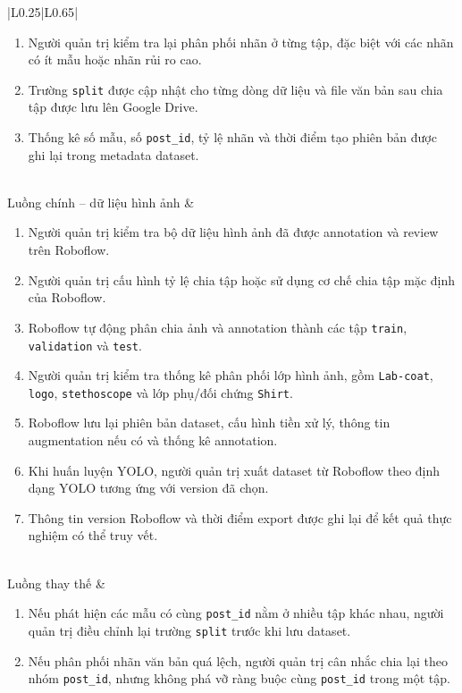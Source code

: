 \begin{longtable}{|L{0.25\textwidth}|L{0.65\textwidth}|}
\begin{minipage}[t]{\linewidth}
\begin{enumerate}[label=\textbf{Bước \arabic*:}, leftmargin=1.55cm, itemsep=0pt, topsep=0pt]
    \item Người quản trị kiểm tra lại phân phối nhãn ở từng tập, đặc biệt với các nhãn có ít mẫu hoặc nhãn rủi ro cao.
    \item Trường \texttt{split} được cập nhật cho từng dòng dữ liệu và file văn bản sau chia tập được lưu lên Google Drive.
    \item Thống kê số mẫu, số \texttt{post\_id}, tỷ lệ nhãn và thời điểm tạo phiên bản được ghi lại trong metadata dataset.
\end{enumerate}
\end{minipage} \\ \hline
Luồng chính -- dữ liệu hình ảnh &
\begin{minipage}[t]{\linewidth}
\begin{enumerate}[label=\textbf{Bước \arabic*:}, leftmargin=1.55cm, itemsep=0pt, topsep=0pt]
    \item Người quản trị kiểm tra bộ dữ liệu hình ảnh đã được annotation và review trên Roboflow.
    \item Người quản trị cấu hình tỷ lệ chia tập hoặc sử dụng cơ chế chia tập mặc định của Roboflow.
    \item Roboflow tự động phân chia ảnh và annotation thành các tập \texttt{train}, \texttt{validation} và \texttt{test}.
    \item Người quản trị kiểm tra thống kê phân phối lớp hình ảnh, gồm \texttt{Lab-coat}, \texttt{logo}, \texttt{stethoscope} và lớp phụ/đối chứng \texttt{Shirt}.
    \item Roboflow lưu lại phiên bản dataset, cấu hình tiền xử lý, thông tin augmentation nếu có và thống kê annotation.
    \item Khi huấn luyện YOLO, người quản trị xuất dataset từ Roboflow theo định dạng YOLO tương ứng với version đã chọn.
    \item Thông tin version Roboflow và thời điểm export được ghi lại để kết quả thực nghiệm có thể truy vết.
\end{enumerate}
\end{minipage} \\ \hline
Luồng thay thế &
\begin{minipage}[t]{\linewidth}
\begin{enumerate}[label=\textbf{Bước \arabic*:}, leftmargin=1.55cm, itemsep=0pt, topsep=0pt]
    \item Nếu phát hiện các mẫu có cùng \texttt{post\_id} nằm ở nhiều tập khác nhau, người quản trị điều chỉnh lại trường \texttt{split} trước khi lưu dataset.
    \item Nếu phân phối nhãn văn bản quá lệch, người quản trị cân nhắc chia lại theo nhóm \texttt{post\_id}, nhưng không phá vỡ ràng buộc cùng \texttt{post\_id} trong một tập.

\end{enumerate}
\end{minipage}
\end{longtable}

